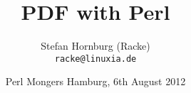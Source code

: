
\usepackage[T1]{fontenc}
\usepackage{mathptmx}
\usepackage[scaled=.90]{helvet}
\usepackage{courier}

\usepackage{beamerthemesplit}
\usepackage{verbatim}
\usepackage{hyperref}
\usepackage{listings}
\lstset{language=Perl,basicstyle=\footnotesize,tabsize=3,showstringspaces=false}

\title{PDF with Perl}
\author[racke]{Stefan Hornburg (Racke)\\ \texttt{racke@linuxia.de}}
\date[]{Perl Mongers Hamburg, 6th August 2012}


\maketitle{}

\begin{frame}
  \titlepage
\end{frame}

\tableofcontents



